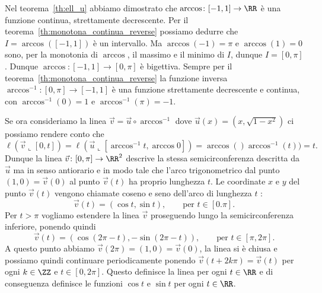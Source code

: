     Nel teorema~\ref{th:ell_u} abbiamo dimostrato che 
    $\arccos\colon [-1,1]\to \RR$ è una funzione 
    continua, strettamente decrescente.
    Per il teorema~\ref{th:monotona_continua_reverse}
    possiamo dedurre che $I = \arccos([-1,1])$ è un intervallo.
    Ma $\arccos(-1) = \pi$ e $\arccos(1)=0$ sono, 
    per la monotonia di $\arccos$,
    il massimo e il minimo di $I$, dunque $I=[0,\pi]$.
    Dunque $\arccos\colon [-1,1]\to [0,\pi]$ è bigettiva.
    Sempre per il teorema~\ref{th:monotona_continua_reverse}
    la funzione inversa $\arccos^{-1}\colon [0,\pi]\to[-1,1]$
    è una funzione strettamente decrescente e continua, 
    con $\arccos^{-1}(0) = 1$ e $\arccos^{-1}(\pi)=-1$.
    
    Se ora consideriamo la linea $\vec v = \vec u \circ \arccos^{-1}$
    dove $\vec u(x)=(x,\sqrt{1-x^2})$ ci possiamo rendere conto 
    che 
    \[
     \ell(\vec v\llcorner [0,t])  
     = \ell(\vec u\llcorner[\arccos^{-1} t,\arccos 0])
     = \arccos ()\arccos^{-1} (t)) = t.
    \]
    Dunque la linea $\vec v\colon[0,\pi]\to\RR^2$ descrive la stessa
    semicirconferenza descritta da $\vec u$ ma in senso antiorario 
    e in modo tale che l'arco trigonometrico dal punto $(1,0)=\vec v(0)$ 
    al punto $\vec v(t)$ ha proprio lunghezza $t$.
    Le coordinate $x$ e $y$ del punto $\vec v(t)$ vengono chiamate 
    coseno e seno dell'arco di lunghezza $t$%
    :
    \[
      \vec v(t) = (\cos t, \sin t), \qquad\text{per $t\in[0.\pi]$}.  
    \]
    Per $t>\pi$ vogliamo estendere la linea $\vec v$ proseguendo 
    lungo la semicirconferenza inferiore, ponendo quindi 
    \[
      \vec v(t) = (\cos (2\pi - t), -\sin (2\pi - t)), \qquad \text{per $t\in[\pi,2\pi]$}.  
    \]
    A questo punto abbiamo $\vec v(2 \pi) = (1,0) = \vec v(0)$, la linea si è chiusa 
    e possiamo quindi continuare periodicamente ponendo $\vec v(t+2 k \pi) = \vec v(t)$ 
    per ogni $k\in \ZZ$ e $t\in[0,2\pi]$.
    Questo definisce la linea per ogni $t\in \RR$ e di conseguenza 
    definisce le funzioni $\cos t$ e $\sin t$ per ogni $t\in \RR$.
    